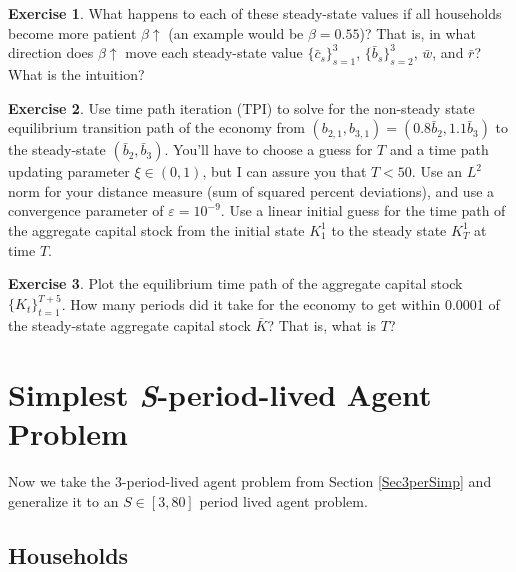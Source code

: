 \documentclass[letterpaper,12pt]{article}
\theoremstyle{definition}
\newtheorem{exercise}{Exercise} %
\numberwithin{equation}{section}
\numberwithin{exercise}{section}
\newcommand{\ve}{\varepsilon}
\begin{document}
\begin{spacing}{1.5}
      \begin{exercise} \label{Ex3perSimp_rho}
         What happens to each of these steady-state values if all households become more patient $\beta\uparrow$ (an example would be $\beta = 0.55$)? That is, in what direction does $\beta\uparrow$ move each steady-state value $\{\bar{c}_s\}_{s=1}^3$, $\{\bar{b}_s\}_{s=2}^3$, $\bar{w}$, and $\bar{r}$? What is the intuition?
      \end{exercise}

      \begin{exercise} \label{Ex3perSimp_TPI}
         Use time path iteration (TPI) to solve for the non-steady state equilibrium transition path of the economy from $(b_{2,1},b_{3,1})=(0.8\bar{b}_2,1.1\bar{b}_3)$ to the steady-state $(\bar{b}_2,\bar{b}_3)$. You'll have to choose a guess for $T$ and a time path updating parameter $\xi\in(0,1)$, but I can assure you that $T<50$. Use an $L^2$ norm for your distance measure (sum of squared percent deviations), and use a convergence parameter of $\ve = 10^{-9}$. Use a linear initial guess for the time path of the aggregate capital stock from the initial state $K_1^1$ to the steady state $K_T^1$ at time $T$.
      \end{exercise}

      \begin{exercise} \label{Ex3perSimp_TPIplot}
         Plot the equilibrium time path of the aggregate capital stock $\{K_t\}_{t=1}^{T+5}$. How many periods did it take for the economy to get within 0.0001 of the steady-state aggregate capital stock $\bar{K}$? That is, what is $T$?
      \end{exercise}


\newpage
\section{Simplest \textit{S}-period-lived Agent Problem}\label{SecSperSimp}

   Now we take the 3-period-lived agent problem from Section \ref{Sec3perSimp} and generalize it to an $S\in[3,80]$ period lived agent problem.


   \subsection{Households}\label{SecSperSimpHH}


\end{spacing}
\end{document}
